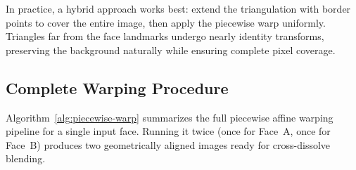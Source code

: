 In practice, a hybrid approach works best: extend the triangulation with border points to cover the entire image, then apply the piecewise warp uniformly. Triangles far from the face landmarks undergo nearly identity transforms, preserving the background naturally while ensuring complete pixel coverage.

\subsection{Complete Warping Procedure}

Algorithm~\ref{alg:piecewise-warp} summarizes the full piecewise affine warping pipeline for a single input face. Running it twice (once for Face~A, once for Face~B) produces two geometrically aligned images ready for cross-dissolve blending.

